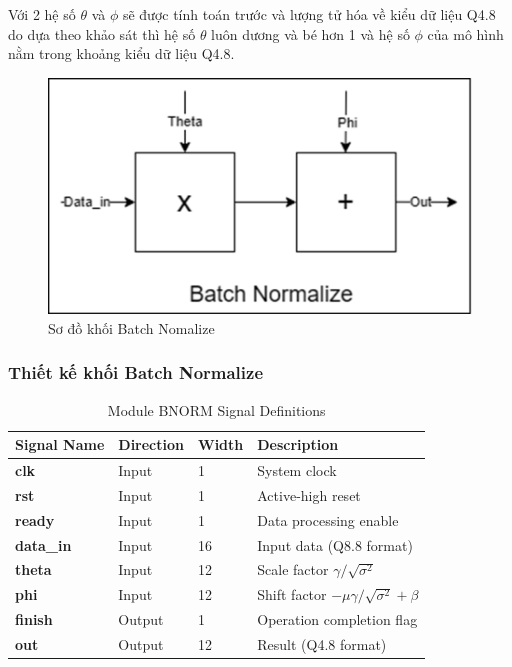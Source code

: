 Với 2 hệ số $\theta$ và $\phi$ sẽ được tính toán trước và lượng tử hóa về kiểu dữ liệu Q4.8 do dựa theo khảo sát thì hệ số $\theta$ luôn dương và bé hơn 1 và hệ số $\phi$ của mô hình nằm trong khoảng kiểu dữ liệu Q4.8.
\begin{figure}[H]
    \centering
    \includegraphics[width=0.5\linewidth]{Images/bnormblock.png}
    \caption{Sơ đồ khối Batch Nomalize}
    \label{fig:enter-label}
\end{figure}

\subsubsection{Thiết kế khối Batch Normalize}
\begin{table}[h]
\centering
\caption{Module BNORM Signal Definitions}
\label{tab:bnorm_signals}
\begin{tabular}{|>{\bfseries}l|l|l|l|}
\hline
\textbf{Signal Name} & \textbf{Direction} & \textbf{Width} & \textbf{Description} \\ \hline
clk      & Input  & 1  & System clock \\ \hline
rst      & Input  & 1  & Active-high reset \\ \hline
ready    & Input  & 1  & Data processing enable \\ \hline
data\_in & Input  & 16 & Input data (Q8.8 format) \\ \hline
theta    & Input  & 12 & Scale factor $\gamma/\sqrt{\sigma^2}$ \\ \hline
phi      & Input  & 12 & Shift factor $-\mu\gamma/\sqrt{\sigma^2} + \beta$ \\ \hline
finish   & Output & 1  & Operation completion flag \\ \hline
out      & Output & 12 & Result (Q4.8 format) \\ \hline
\end{tabular}
\end{table}

